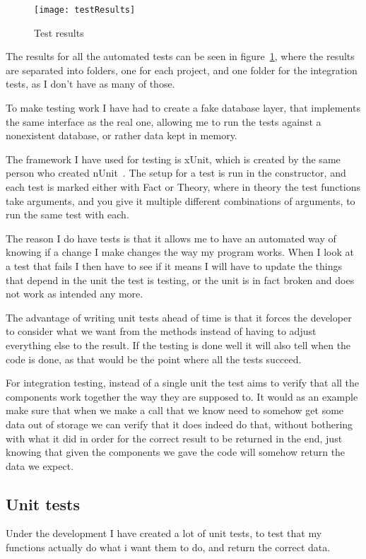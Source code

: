 \begin{figure}[h]
  \centering
  \texttt{[image: testResults]}
  \caption{Test results}
  \label{fig:testResults}
\end{figure}

The results for all the automated tests can be seen in
figure~\ref{fig:testResults}, where the results are separated into folders, one
for each project, and one folder for the integration tests, as I don't have as
many of those.

To make testing work I have had to create a fake database layer, that implements
the same interface as the real one, allowing me to run the tests against a
nonexistent database, or rather data kept in memory.

The framework I have used for testing is xUnit, which is created by the same
person who created nUnit~\cite{xunit}. The setup for a test is run in the
constructor, and each test is marked either with Fact or Theory, where in theory
the test functions take arguments, and you give it multiple different
combinations of arguments, to run the same test with each.

The reason I do have tests is that it allows me to have an automated way of
knowing if a change I make changes the way my program works. When I look at a
test that fails I then have to see if it means I will have to update the things
that depend in the unit the test is testing, or the unit is in fact broken and
does not work as intended any more. 

The advantage of writing unit tests ahead of time is that it forces the
developer to consider what we want from the methods instead of having to adjust
everything else to the result. If the testing is done well it will also tell
when the code is done, as that would be the point where all the tests succeed.

For integration testing, instead of a single unit the test aims to verify that
all the components work together the way they are supposed to. It would as an
example make sure that when we make a call that we know need to somehow get some
data out of storage we can verify that it does indeed do that, without bothering
with what it did in order for the correct result to be returned in the end, just
knowing that given the components we gave the code will somehow return the data
we expect.

\subsection{Unit tests}
\label{sec:unit_tests}
Under the development I have created a lot of unit tests, to test that my
functions actually do what i want them to do, and return the correct data.

